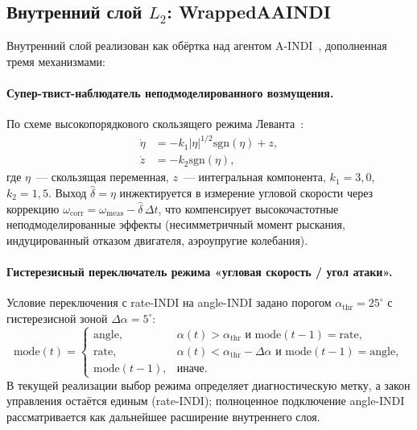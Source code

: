 \documentclass[a4paper,14pt]{extarticle}
\newcommand{\AINDI}{\textsc{A-INDI}}
\newcommand{\degr}{^{\circ}}
\begin{document}
\subsection{\texorpdfstring{Внутренний слой $L_2$: WrappedAAINDI}{Внутренний слой L2: WrappedAAINDI}}

Внутренний слой реализован как обёртка над агентом \AINDI{}~\cite{aaindi2024}, дополненная тремя механизмами:

\paragraph{Супер-твист-наблюдатель неподмоделированного возмущения.} По схеме высокопорядкового скользящего режима Леванта~\cite{levant1993}:
\begin{align}
\dot \eta &= -k_1 |\eta|^{1/2} \mathrm{sgn}(\eta) + z, \label{eq:supertwist-eta}\\
\dot z &= -k_2 \mathrm{sgn}(\eta),  \label{eq:supertwist-z}
\end{align}
где $\eta$~--- скользящая переменная, $z$~--- интегральная компонента, $k_1=3{,}0$, $k_2=1{,}5$. Выход $\hat\delta = \eta$ инжектируется в измерение угловой скорости через коррекцию $\omega_{\text{corr}} = \omega_{\text{meas}} - \hat\delta\,\Delta t$, что компенсирует высокочастотные неподмоделированные эффекты (несимметричный момент рыскания, индуцированный отказом двигателя, аэроупругие колебания).

\paragraph{Гистерезисный переключатель режима «угловая скорость / угол атаки».} Условие переключения с rate-INDI на angle-INDI задано порогом $\alpha_{\text{thr}}=25\degr$ с гистерезисной зоной $\Delta\alpha=5\degr$:
\begin{equation}
\text{mode}(t) = \begin{cases}
\text{angle}, & \alpha(t) > \alpha_{\text{thr}} \text{ и mode}(t-1)=\text{rate}, \\
\text{rate}, & \alpha(t) < \alpha_{\text{thr}} - \Delta\alpha \text{ и mode}(t-1)=\text{angle}, \\
\text{mode}(t-1), & \text{иначе}.
\end{cases}
\label{eq:mode-switch}
\end{equation}
В текущей реализации выбор режима определяет диагностическую метку, а закон управления остаётся единым (rate-INDI); полноценное подключение angle-INDI рассматривается как дальнейшее расширение внутреннего слоя.
\end{document}
